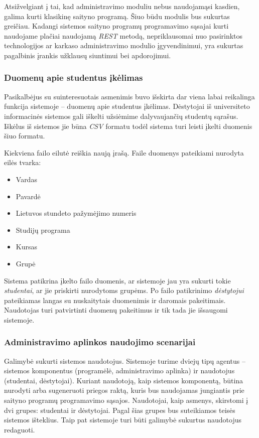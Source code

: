 \documentclass{VUMIFPSkursinis}
\begin{document}
Atsižvelgiant į tai, kad administravimo moduliu nebus naudojamąsi kasdien, galima kurti klasikinę saityno programą. Šiuo būdu modulis bus sukurtas greičiau. Kadangi sistemos saityno programų programavimo sąsajai kurti naudojame plačiai naudojamą \textit{REST} metodą, nepriklausomai nuo pasirinktos technologijos ar karkaso administravimo modulio įgyvendinimui, yra sukurtas pagalbinis įrankis užklausų siuntimui bei apdorojimui.

\subsubsection{Duomenų apie studentus įkėlimas} \label{data-import}

Pasikalbėjus su suinteresuotais asmenimis buvo išskirta dar viena labai reikalinga funkcija sistemoje – duomenų apie studentus įkėlimas. Dėstytojai iš universiteto informacinės sistemos gali iškelti užsiėmime dalyvaujančių studentų sąrašus. Iškėlus iš sistemos jie būna \textit{CSV} formatu todėl sistema turi leisti įkelti duomenis šiuo formatu.

Kiekviena failo eilutė reiškia naują įrašą. Faile duomenys pateikiami nurodyta eilės tvarka:

\begin{itemize}
    \item Vardas
    \item Pavardė
    \item Lietuvos stundeto pažymėjimo numeris
    \item Studijų programa
    \item Kursas
    \item Grupė
\end{itemize}

Sistema patikrina įkelto failo duomenis, ar sistemoje jau yra sukurti tokie \textit{studentai}, ar jie priskirti nurodytoms grupėms. Po failo patikrinimo \textit{dėstytojui} pateikiamas langas su nuskaitytais duomenimis ir daromais pakeitimais. Naudotojas turi patvirtinti duomenų pakeitimus ir tik tada jie išsaugomi sistemoje.

\subsubsection{Administravimo aplinkos naudojimo scenarijai}


Galimybė sukurti sistemos naudotojus. Sistemoje turime dviejų tipų agentus – sistemos komponentus (programėlė, administravimo aplinka) ir naudotojus (studentai, dėstytojai). Kuriant naudotoją, kaip sistemos komponentą, būtina nurodyti arba sugeneruoti priegos raktą, kuris bus naudojamas jungiantis prie saityno programų programavimo sąsajos. Naudotojai, kaip asmenys, skirstomi į dvi grupes: studentai ir dėstytojai. Pagal šias grupes bus suteikiamos teisės sistemos išteklius. Taip pat sistemoje turi būti galimybė sukurtus naudotojus redaguoti.
\end{document}
